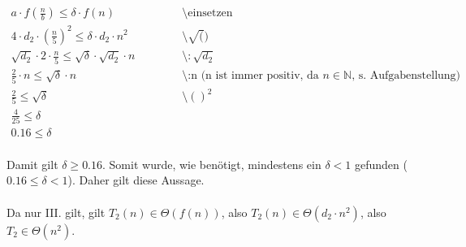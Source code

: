 \documentclass{article}
\begin{document}
\begin{enumerate}
   	    \[
   	        \begin{array}{lll}
   	            a \cdot f(\frac{n}{b}) \leq \delta \cdot f(n)~~~~~~~~~~~~~~~~~~~~~~~&\text{\textbackslash einsetzen}\\
   	            4 \cdot d_2\cdot (\frac{n}{5})^2 \leq \delta \cdot d_2\cdot n^2 &\text{\textbackslash $\sqrt()$}\\
   	            \sqrt{d_2}\cdot 2 \cdot \frac{n}{5} \leq \sqrt{\delta}\cdot \sqrt{d_2} \cdot n & \text{\textbackslash $:\sqrt{d_2}$}\\
   	            \frac{2}{5}\cdot n \leq \sqrt{\delta} \cdot n &\text{\textbackslash :n    (n ist immer positiv, da $n \in \mathbb{N}$, s. Aufgabenstellung)}\\
   	            \frac{2}{5} \leq \sqrt{\delta} &\text{\textbackslash $()^2$}\\
   	            \frac{4}{25} \leq \delta\\
   	            0.16 \leq \delta
   	        \end{array}
   	    \]
   	    \\
   	    Damit gilt $\delta \geq 0.16$. Somit wurde, wie benötigt, mindestens ein $\delta < 1$ gefunden ($0.16 \leq \delta < 1$). Daher gilt diese Aussage.
   	    \\\\
   	    Da nur III. gilt, gilt $T_2(n) \in \Theta (f(n))$, also $T_2(n) \in \Theta (d_2\cdot n^2)$, also $T_2 \in \Theta (n^2)$.
   	\end{enumerate}
   	
\end{document}
